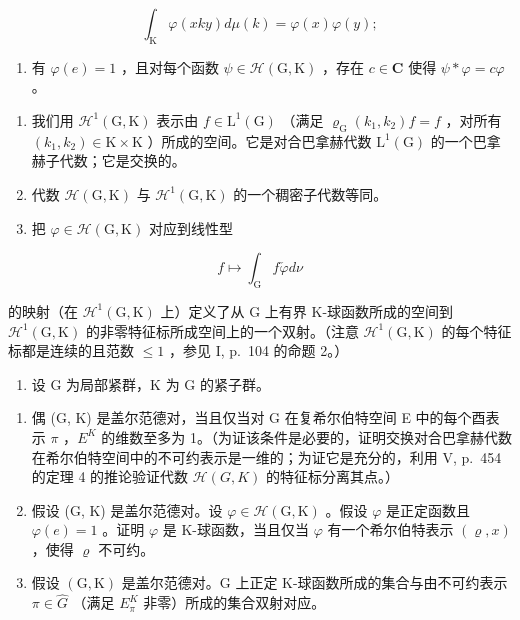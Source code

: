 \[
\int_ {\mathrm{K}} \varphi (x k y) d \mu (k) = \varphi (x) \varphi (y);
\]

\begin{enumerate}
\def\labelenumi{(\roman{enumi})}
\setcounter{enumi}{2}
\tightlist
\item
  有 \(\varphi(e)=1\) ，且对每个函数 \(\psi\in\mathcal{H}(\mathrm{G},\mathrm{K})\) ，存在 \(c\in\mathbf{C}\) 使得 \(\psi*\varphi=c\varphi\) 。
\end{enumerate}

\begin{enumerate}
\def\labelenumi{\alph{enumi})}
\setcounter{enumi}{1}
\item
  我们用 \(\mathcal{H}^1 (\mathrm{G},\mathrm{K})\) 表示由 \(f\in \mathrm{L}^1 (\mathrm{G})\) （满足 \(\varrho_{\mathrm{G}}(k_1,k_2)f = f\) ，对所有 \((k_{1},k_{2})\in \mathrm{K}\times \mathrm{K}\) ）所成的空间。它是对合巴拿赫代数 \(\mathrm{L}^1 (\mathrm{G})\) 的一个巴拿赫子代数；它是交换的。
\item
  代数 \(\mathcal{H}(\mathrm{G},\mathrm{K})\) 与 \(\mathcal{H}^1 (\mathrm{G},\mathrm{K})\) 的一个稠密子代数等同。\\
\item
  把 \(\varphi \in \mathcal{H}(\mathrm{G},\mathrm{K})\) 对应到线性型
\end{enumerate}

\[
f \mapsto \int_ {\mathrm{G}} f \check {\varphi} d \nu
\]

的映射（在 \(\mathcal{H}^{1}(\mathrm{G},\mathrm{K})\) 上）定义了从 G 上有界 K-球函数所成的空间到 \(\mathcal{H}^{1}(\mathrm{G},\mathrm{K})\) 的非零特征标所成空间上的一个双射。（注意 \(\mathcal{H}^{1}(\mathrm{G},\mathrm{K})\) 的每个特征标都是连续的且范数 \(\leqslant 1\) ，参见 I, p.~104 的命题 2。）

\begin{enumerate}
\def\labelenumi{\arabic{enumi})}
\setcounter{enumi}{27}
\tightlist
\item
  设 G 为局部紧群，K 为 G 的紧子群。
\end{enumerate}

\begin{enumerate}
\def\labelenumi{\alph{enumi})}
\item
  偶 (G, K) 是盖尔范德对，当且仅当对 G 在复希尔伯特空间 E 中的每个酉表示 \(\pi\) ，\(E^{K}\) 的维数至多为 1。（为证该条件是必要的，证明交换对合巴拿赫代数在希尔伯特空间中的不可约表示是一维的；为证它是充分的，利用 V, p.~454 的定理 4 的推论验证代数 \(\mathcal{H}(G,K)\) 的特征标分离其点。）
\item
  假设 (G, K) 是盖尔范德对。设 \(\varphi \in \mathcal{H}(\mathrm{G},\mathrm{K})\) 。假设 \(\varphi\) 是正定函数且 \(\varphi(e) = 1\) 。证明 \(\varphi\) 是 K-球函数，当且仅当 \(\varphi\) 有一个希尔伯特表示 \((\varrho, x)\) ，使得 \(\varrho\) 不可约。
\item
  假设 \((\mathrm{G},\mathrm{K})\) 是盖尔范德对。G 上正定 K-球函数所成的集合与由不可约表示 \(\pi\in\widehat{G}\) （满足 \(E_{\pi}^{K}\) 非零）所成的集合双射对应。
\end{enumerate}

